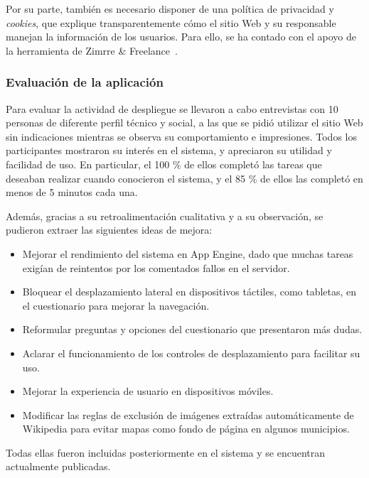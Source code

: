 Por su parte, también es necesario disponer de una política de privacidad y \textit{cookies}, que explique transparentemente cómo el sitio Web y su responsable manejan la información de los usuarios. Para ello, se ha contado con el apoyo de la herramienta de Zimrre \& Freelance~\cite{privacidad}.

\subsubsection{Evaluación de la aplicación}

Para evaluar la actividad de despliegue se llevaron a cabo entrevistas con 10 personas de diferente perfil técnico y social, a las que se pidió utilizar el sitio Web sin indicaciones mientras se observa su comportamiento e impresiones. Todos los participantes mostraron su interés en el sistema, y apreciaron su utilidad y facilidad de uso. En particular, el 100 \% de ellos completó las tareas que deseaban realizar cuando conocieron el sistema, y el 85 \% de ellos las completó en menos de 5 minutos cada una.

Además, gracias a su retroalimentación cualitativa y a su observación, se pudieron extraer las siguientes ideas de mejora:

\begin{itemize}
    \item Mejorar el rendimiento del sistema en App Engine, dado que muchas tareas exigían de reintentos por los comentados fallos en el servidor.
    \item Bloquear el desplazamiento lateral en dispositivos táctiles, como tabletas, en el cuestionario para mejorar la navegación.
    \item Reformular preguntas y opciones del cuestionario que presentaron más dudas.
    \item Aclarar el funcionamiento de los controles de desplazamiento para facilitar su uso.
    \item Mejorar la experiencia de usuario en dispositivos móviles.
    \item Modificar las reglas de exclusión de imágenes extraídas automáticamente de Wikipedia para evitar mapas como fondo de página en algunos municipios.
\end{itemize}

Todas ellas fueron incluidas posteriormente en el sistema y se encuentran actualmente publicadas.
